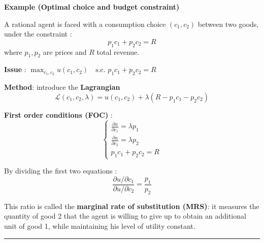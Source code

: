 \begin{f}
		\textbf{Example (Optimal choice and budget constraint)}
	
	A rational agent is faced with a consumption choice \((c_1, c_2)\) between two goods, under the constraint :
	\[
	p_1 c_1 + p_2 c_2 = R
	\]
	where \(p_1, p_2\) are prices and \(R\) total revenue.
	
	\textbf{Issue} :
	\(
	\max_{c_1, c_2} u(c_1, c_2) \quad \text{s.c. } p_1 c_1 + p_2 c_2 = R\)

	
	\textbf{Method}: introduce the \textbf{Lagrangian}
	\[
	\mathcal{L}(c_1, c_2, \lambda) = u(c_1, c_2) + \lambda (R - p_1 c_1 - p_2 c_2)
	\]
	
	\textbf{First order conditions (FOC)} :
	\[
	\begin{cases}
		\frac{\partial u}{\partial c_1} = \lambda p_1 \\
		\frac{\partial u}{\partial c_2} = \lambda p_2 \\
		p_1 c_1 + p_2 c_2 = R
	\end{cases}
	\]
	
	By dividing the first two equations :
	\[
	\frac{\partial u / \partial c_1}{\partial u / \partial c_2} = \frac{p_1}{p_2}
	\]
	
	This ratio is called the \textbf{marginal rate of substitution (MRS)}: it measures the quantity of good 2 that the agent is willing to give up to obtain an additional unit of good 1, while maintaining his level of utility constant.
	
\end{f}
\hrule

